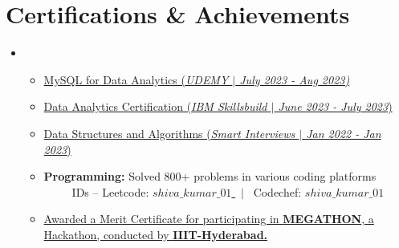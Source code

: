 \documentclass[12pt, a4paper]{article}
\newcommand{\resumeItem}[1]{
  \item\small{
    {#1 \vspace{-2pt}}
  }
}
\newcommand{\resumeItemListStart}{\begin{itemize}}
\newcommand{\resumeItemListEnd}{\end{itemize}\vspace{-6pt}}
\begin{document}
\section{Certifications \& Achievements}
 \begin{itemize}[leftmargin=0.15in, label={}]
    
    \item{
    \resumeItemListStart
        \resumeItem{
            \href{https://}{ 
            {MySQL for Data Analytics (\emph{UDEMY $|$ July 2023 - Aug 2023)}
            }\faExternalLink*} \\             
        } \vspace{3pt}
        \resumeItem{
        \href{https://}{ 
            {Data Analytics Certification (\emph{IBM Skillsbuild $|$ June 2023 - July 2023}) 
            }\faExternalLink*}
        } \vspace{3pt}
        \resumeItem{
        \href{https://}{ {Data Structures and Algorithms (\emph{Smart Interviews $|$ Jan 2022 - Jan 2023})  
            }\faExternalLink*}
        }
        \resumeItem{
            \textbf{ Programming: }{Solved 800+ problems in various coding platforms} \vspace{3pt}
            { \\ \ \ \ \ \ IDs --
            {Leetcode: \href{https://leetcode.com/shiva_kumar_01}{{\bf$shiva\_kumar\_01$ }\faExternalLink*} } \ $|$ \ 
            {Codechef: \href{https://www.codechef.com/users/shiva_kumar_01}{{\bf$shiva\_kumar\_01$ }\faExternalLink*} }
            }
        }
        \resumeItem{
\href{https://drive.google.com/file/d/1e3po31SH4F8SK9jfTujhWRTyP6mIwR3i/view?usp=sharing}{Awarded a Merit Certificate for participating in {\bf MEGATHON}, a Hackathon, conducted by  {\ttfamily\bfseries IIIT-Hyderabad.}
 \faExternalLink*
 } 
        }
     \resumeItemListEnd
  }
 \end{itemize}
\end{document}
